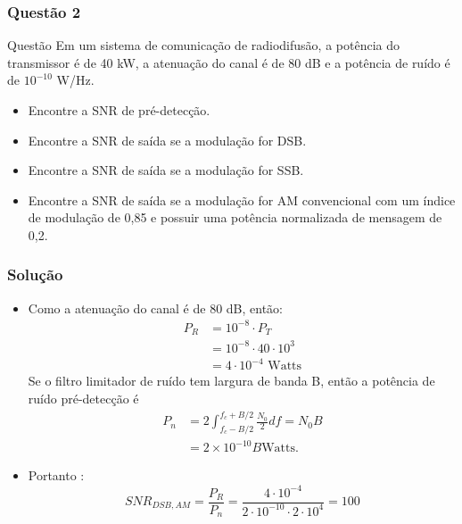 \documentclass[aspectratio=169,dvipsnames]{beamer}
\begin{document}
\begin{frame}
  \frametitle{Questão 2}

  \begin{block}{Questão}
    Em um sistema de comunicação de radiodifusão, a 
    potência do transmissor é de 40 \si{\kilo\watt}, a atenuação do canal é de 80 dB e a
     potência de ruído é de $10^{-10}$ W/Hz.

     \begin{itemize}
      \item Encontre a SNR de pré-detecção.
      \item Encontre a SNR de saída se a modulação for DSB.
      \item Encontre a SNR de saída se a modulação for SSB.
      \item Encontre a SNR de saída se a modulação for AM convencional com um índice de modulação de 0,85 e possuir uma potência normalizada de mensagem de 0,2.
      \end{itemize}
  \end{block}

\end{frame}

\begin{frame}
  \frametitle{Solução}

  \begin{itemize}
    \item  Como a atenuação do canal é de 80 dB, então: 
    \begin{align*}
      P_R &= 10^{-8} \cdot P_T \\
        &= 10^{-8} \cdot 40 \cdot 10^3 \\
        & = 4 \cdot 10^{-4} \text{ Watts}
      \end{align*}
      Se o filtro limitador de ruído tem largura de banda B, então a potência de ruído pré-detecção é
      \begin{align*}
        P_n &= 2 \int_{f_c - B/2}^{f_c + B/2} \frac{N_0}{2}df = N_0B  \\
        & = 2 \times 10^{-10} B \text{Watts}.
      \end{align*}
    \item Portanto  : 
      \begin{equation*}
        SNR_{DSB,AM} = \frac{P_R}{P_n} = \frac{4\cdot 10^{-4}}{2 \cdot 10^{-10} \cdot 2 \cdot 10^4} = 100
        \end{equation*}
  \end{itemize}

\end{frame}
\end{document}
